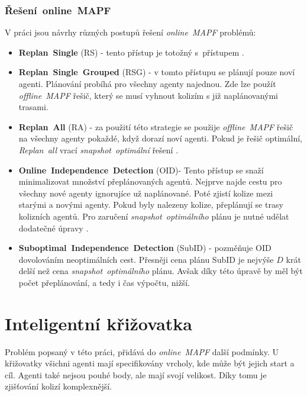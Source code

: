 \subsubsection{Řešení~online~MAPF}\label{subsubsec:reseni_online_mapf}

V práci \citet{Svancara} jsou návrhy různých postupů řešení \emph{online~MAPF} problémů:
\begin{itemize}
  \item \textbf{Replan~Single} (RS) - tento přístup je totožný s~přístupem .
  \item \textbf{Replan~Single~Grouped}\label{par:replan-single-grouped} (RSG) - v tomto přístupu se plánují pouze noví agenti.
  Plánování probíhá pro všechny agenty najednou.
  Zde lze použít \emph{offline~MAPF} řešič, který se musí vyhnout kolizím s již naplánovanými trasami.
  \item \textbf{Replan~All} (RA) - za použití této strategie se použije \emph{offline~MAPF} řešič na všechny agenty pokaždé, když dorazí noví agenti.
  Pokud je řešič optimální, \emph{Replan~all} vrací \emph{snapshot~optimální} řešení \citep{Svancara}.
  \item \textbf{Online~Independence~Detection} (OID)- Tento přístup se snaží minimalizovat množství přeplánovaných agentů.
  Nejprve najde cestu pro všechny nové agenty ignorujíce už naplánované.
  Poté zjistí kolize mezi starými a novými agenty.
  Pokud byly nalezeny kolize, přeplánují se trasy kolizních agentů.
  Pro zaručení \emph{snapshot~optimálního} plánu je nutné udělat dodatečné úpravy \citep{Svancara}.
  \item \textbf{Suboptimal~Independence~Detection} (SubID) - pozměňuje OID dovolováním neoptimálních cest.
  Přesněji cena plánu SubID je nejvýše $D$ krát delší než cena \emph{snapshot~optimálního} plánu.
  Avšak díky této úpravě by měl být počet přeplánování, a tedy i čas výpočtu, nižší.
\end{itemize}


\section{Inteligentní křižovatka}\label{sec:inteligentni-krizovatka}
Problém popsaný v této práci, přidává do \emph{online~MAPF} další podmínky.
U křižovatky všichni agenti mají specifikovány vrcholy, kde může být jejich start a cíl.
Agenti také nejsou pouhé body, ale mají svojí velikost.
Díky tomu je zjišťování kolizí komplexnější.

